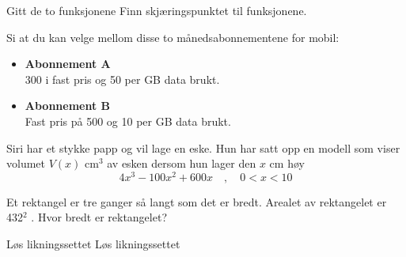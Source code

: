 Gitt de to funksjonene
Finn skjæringspunktet til funksjonene.

Si at du kan velge mellom disse to månedsabonnementene for mobil:
\begin{itemize}
	\item \textbf{Abonnement A} \\
	300 i fast pris og 50 per GB data brukt.
	\item \textbf{Abonnement B} \\
	Fast pris på 500 og 10 per GB data brukt.
\end{itemize}

Siri har et stykke papp og vil lage en eske. Hun har satt opp en modell som viser
volumet $ V(x) $ cm$ ^3 $ av esken dersom hun lager den $ x $ cm høy
\[ 4x^3-100x^2+600x\quad,\quad 0<x<10\]

Et rektangel er tre ganger så langt som det er bredt. Arealet av rektangelet er 432$ ^2 $ .\os
Hvor bredt er rektangelet?



\nes
{}
Løs likningssettet
Løs likningssettet


